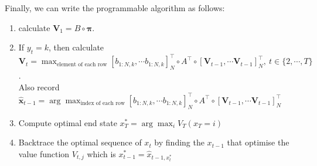 \documentclass{article} [10pt] %
\newcommand{\bs}{\boldsymbol}
\begin{document}
Finally, we can write the programmable algorithm as follows:
\begin{enumerate}
	\item calculate $\mathbf V_1 = B \circ\bs\pi$.
	\item If $y_t=k$, then calculate $\mathbf V_t = \max_{\text{element of each row}} [b_{1:N, k}, \cdots b_{1:N, k}]_N^\top \circ A^\top \circ [\mathbf V_{t-1}, \cdots \mathbf V_{t-1}]_N^\top,\ t \in\{2,\cdots, T\}$. \\
	 Also record $\mathbf{\hat x}_{t-1}  = \arg\max_{\text{index of each row}} [b_{1:N, k}, \cdots b_{1:N, k}]_N^\top \circ A^\top \circ [\mathbf V_{t-1}, \cdots \mathbf V_{t-1}]_N^\top$
	\item Compute optimal end state $x_T^*=\arg\max_i V_T(x_T=i)$
	\item Backtrace the optimal sequence of $x_t$ by finding the $x_{t-1}$ that optimise the value function $V_{t, j}$ which is $x^*_{t-1} = \hat x_{t-1, x^*_t}$
\end{enumerate}



\newpage
\end{document}
